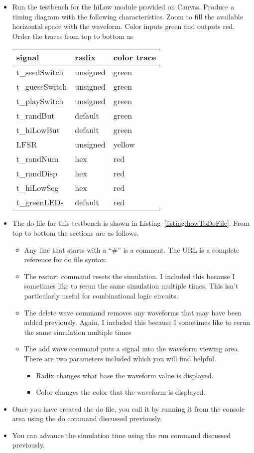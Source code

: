 \begin{itemize}
\item
  Run the testbench for the hiLow module provided on Canvas. Produce a
  timing diagram with the following characteristics. Zoom to fill the
  available horizontal space with the waveform. Color inputs green and
  outputs red. Order the traces from top to bottom as

\begin{tabular}{p{4cm}p{4cm}p{4cm}}
signal & radix & color trace \\ \hline
    t\_seedSwitch 	&	unsigned 	& green \\
    t\_guessSwitch 	&	unsigned 	& green \\
    t\_playSwitch 	& 	unsigned 	& green \\
    t\_randBut 	& 	default 	& green \\
    t\_hiLowBut 	&	default 	& green \\
    LFSR 		& 	unsigned 	& yellow\\
    t\_randNum 	&	hex 		& red \\
    t\_randDisp 	& 	hex 		& red \\
    t\_hiLowSeg 	&	hex 		& red \\
    t\_greenLEDs 	&	default 	& red \\
    \end{tabular}
    

\item
  The do file for this testbench is shown in Listing~\ref{listing:howToDoFile}. From top to
  bottom the sections are as follows.

  \begin{itemize}
  \item
    Any line that starts with a ``\#'' is a comment. The URL is a
    complete reference for do file syntax.
  \item
    The restart command resets the simulation. I included this because I
    sometimes like to rerun the same simulation multiple times. This
    isn't particularly useful for combinational logic circuits.
  \item
    The delete wave command removes any waveforms that may have been
    added previously. Again, I included this because I sometimes like to
    rerun the same simulation multiple times
  \item
    The add wave command puts a signal into the waveform viewing area.
    There are two parameters included which you will find helpful.

    \begin{itemize}
    \item
      Radix changes what base the waveform value is displayed.
    \item
      Color changes the color that the waveform is displayed.
    \end{itemize}
  \end{itemize}
\item
  Once you have created the do file, you call it by running it from the
  console area using the do command discussed previously.
\item
  You can advance the simulation time using the run command discussed
  previously.
\end{itemize}
